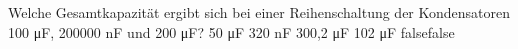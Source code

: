     {Welche Gesamtkapazität ergibt sich bei einer Reihenschaltung der Kondensatoren 100 μF, 200000 nF und 200 μF?}
    {50 μF}
    {320 nF}
    {300,2 μF}
    {102 μF}
    {false}{false}